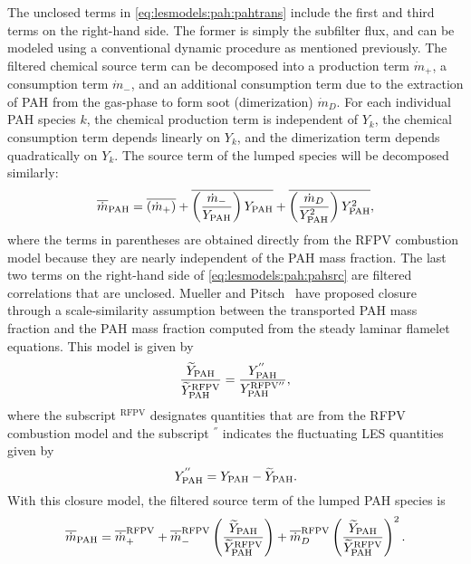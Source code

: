 The unclosed terms in \cref{eq:lesmodels:pah:pahtrans} include the first and third terms on the right-hand side. The former is simply the subfilter flux, and can be modeled using a conventional dynamic procedure as mentioned previously. The filtered chemical source term can be decomposed into a production term $\dot{m}_{+}$, a consumption term $\dot{m}_{-}$, and an additional consumption term due to the extraction of PAH from the gas-phase to form soot (dimerization) $\dot{m}_{D}$. For each individual PAH species $k$, the chemical production term is independent of $Y_k$, the chemical consumption term depends linearly on $Y_k$, and the dimerization term depends quadratically on $Y_k$. The source term of the lumped species will be decomposed similarly:
\begin{equation}\label{eq:lesmodels:pah:pahsrc}
  \fst[m]{\text{PAH}} = \mean{(\dot{m}_{+})} + \mean{\left( \frac{\dot{m}_{-}}{Y_{\text{PAH}}} \right) Y_{\text{PAH}}} + \mean{\left( \frac{\dot{m}_{D}}{Y_{\text{PAH}}^2} \right) Y_{\text{PAH}}^2},
\end{equation}
where the terms in parentheses are obtained directly from the RFPV combustion model because they are nearly independent of the PAH mass fraction. The last two terms on the right-hand side of \cref{eq:lesmodels:pah:pahsrc} are filtered correlations that are unclosed. Mueller and Pitsch~\cite{mueller2012} have proposed closure through a scale-similarity assumption between the transported PAH mass fraction and the PAH mass fraction computed from the steady laminar flamelet equations. This model is given by
\begin{equation}\label{eq:lesmodels:pah:similarity}
  \frac{\tf{Y}_{\text{PAH}}}{\tf{Y}_{\text{PAH}}^{\text{RFPV}}} = \frac{Y_{\text{PAH}}^{''}}{Y_{\text{PAH}}^{\text{RFPV}''}},
\end{equation}
where the subscript $^{\text{RFPV}}$ designates quantities that are from the RFPV combustion model and the subscript $^{''}$ indicates the fluctuating LES quantities given by
\begin{equation}\label{eq:lesmodels:pah:residual}
  Y_{\text{PAH}}^{''} = Y_{\text{PAH}} - \tf{Y}_{\text{PAH}}.
\end{equation}
With this closure model, the filtered source term of the lumped PAH species is
\begin{equation}\label{eq:lesmodels:pah:pahsrcmodeled}
  \fst[m]{\text{PAH}} = \mean{\dot{m}}_{+}^{\text{RFPV}} + \mean{\dot{m}}_{-}^{\text{RFPV}}\left( \frac{\tf{Y}_{\text{PAH}}}{\tf{Y}_{\text{PAH}}^{\text{RFPV}}} \right) + \mean{\dot{m}}_{D}^{\text{RFPV}}\left( \frac{\tf{Y}_{\text{PAH}}}{\tf{Y}_{\text{PAH}}^{\text{RFPV}}} \right)^2.
\end{equation}
